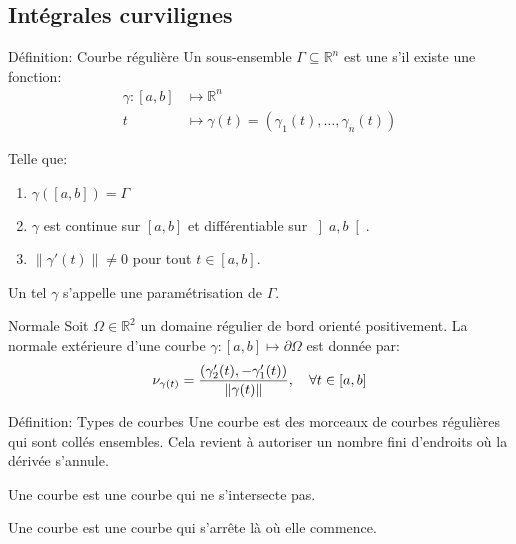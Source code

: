 \documentclass[a4paper]{article}
\begin{document}
\subsection{Intégrales curvilignes}
\begin{parag}{Définition: Courbe régulière}
    Un sous-ensemble $\Gamma \subseteq \mathbb{R}^n$ est une  s'il existe une fonction:
    \[\begin{split}
    \gamma: \left[a, b\right] &\longmapsto \mathbb{R}^n \\
    t &\longmapsto \gamma\left(t\right) = \left(\gamma_1\left(t\right), \ldots, \gamma_n\left(t\right)\right)
    \end{split}\]
    
    Telle que:
    \begin{enumerate}
        \item $\gamma\left(\left[a, b\right]\right) = \Gamma$
        \item $\gamma$ est continue sur $\left[a, b\right]$ et différentiable sur $\left]a, b\right[ $.
        \item $\left\|\gamma'\left(t\right)\right\| \neq 0$ pour tout $t \in \left[a, b\right]$.
    \end{enumerate}
    
    Un tel $\gamma$ s'appelle une paramétrisation de $\Gamma$.

    \begin{subparag}{Normale}
        Soit $\Omega \in \mathbb{R}^2$ un domaine régulier de bord orienté positivement. La normale extérieure d'une courbe $\gamma : \left[a, b\right] \mapsto \partial \Omega$ est donnée par: 
        \[\nu_{\gamma\left(t\right)} = \frac{\left(\gamma_2'\left(t\right), -\gamma'_1\left(t\right)\right)}{\left\|\gamma\left(t\right)\right\|}, \mathspace \forall t \in \left[a, b\right]\]
    \end{subparag}
    
\end{parag}

\begin{parag}{Définition: Types de courbes}
    Une courbe  est des morceaux de courbes régulières qui sont collés ensembles. Cela revient à autoriser un nombre fini d'endroits où la dérivée s'annule.

    Une courbe  est une courbe qui ne s'intersecte pas.

    Une courbe  est une courbe qui s'arrête là où elle commence.
\end{parag}
\end{document}

